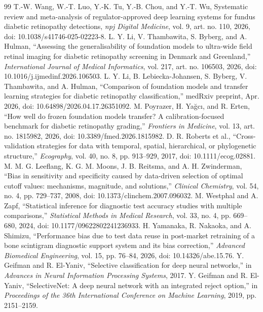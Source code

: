 \documentclass[11pt]{article}
\begin{document}
\begin{thebibliography}{99}
 T.-W. Wang, W.-T. Luo, Y.-K. Tu, Y.-B. Chou, and Y.-T. Wu, Systematic review and meta-analysis of regulator-approved deep learning systems for fundus diabetic retinopathy detections, \emph{npj Digital Medicine}, vol. 9, art. no. 110, 2026, doi: 10.1038/s41746-025-02223-8.
 L. Y. Li, V. Thambawita, S. Byberg, and A. Hulman, ``Assessing the generalisability of foundation models to ultra-wide field retinal imaging for diabetic retinopathy screening in Denmark and Greenland,'' \emph{International Journal of Medical Informatics}, vol. 217, art. no. 106503, 2026, doi: 10.1016/j.ijmedinf.2026.106503.
 L. Y. Li, B. Lebiecka-Johansen, S. Byberg, V. Thambawita, and A. Hulman, ``Comparison of foundation models and transfer learning strategies for diabetic retinopathy classification,'' medRxiv preprint, Apr. 2026, doi: 10.64898/2026.04.17.26351092.
 M. Poyrazer, H. Ya\u{g}c\i, and R. Erten, ``How well do frozen foundation models transfer? A calibration-focused benchmark for diabetic retinopathy grading,'' \emph{Frontiers in Medicine}, vol. 13, art. no. 1815982, 2026, doi: 10.3389/fmed.2026.1815982.
 D. R. Roberts et al., ``Cross-validation strategies for data with temporal, spatial, hierarchical, or phylogenetic structure,'' \emph{Ecography}, vol. 40, no. 8, pp. 913--929, 2017, doi: 10.1111/ecog.02881.
 M. M. G. Leeflang, K. G. M. Moons, J. B. Reitsma, and A. H. Zwinderman, ``Bias in sensitivity and specificity caused by data-driven selection of optimal cutoff values: mechanisms, magnitude, and solutions,'' \emph{Clinical Chemistry}, vol. 54, no. 4, pp. 729--737, 2008, doi: 10.1373/clinchem.2007.096032.
 M. Westphal and A. Zapf, ``Statistical inference for diagnostic test accuracy studies with multiple comparisons,'' \emph{Statistical Methods in Medical Research}, vol. 33, no. 4, pp. 669--680, 2024, doi: 10.1177/09622802241236933.
 H. Yamanaka, R. Nakaoka, and A. Shimizu, ``Performance bias due to test data reuse in post-market retraining of a bone scintigram diagnostic support system and its bias correction,'' \emph{Advanced Biomedical Engineering}, vol. 15, pp. 76--84, 2026, doi: 10.14326/abe.15.76.
 Y. Geifman and R. El-Yaniv, ``Selective classification for deep neural networks,'' in \emph{Advances in Neural Information Processing Systems}, 2017.
 Y. Geifman and R. El-Yaniv, ``SelectiveNet: A deep neural network with an integrated reject option,'' in \emph{Proceedings of the 36th International Conference on Machine Learning}, 2019, pp. 2151--2159.

\end{thebibliography}
\end{document}
